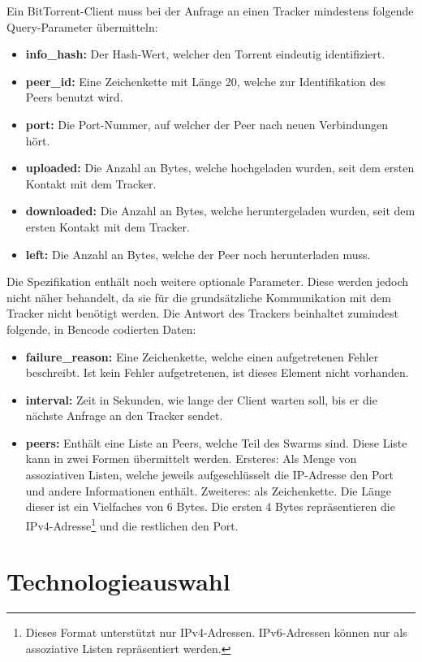 Ein BitTorrent-Client muss bei der Anfrage an einen Tracker mindestens folgende Query-Parameter übermitteln:
\begin{itemize}
    \item \textbf{info\_hash:} Der Hash-Wert, welcher den Torrent eindeutig identifiziert.
    \item \textbf{peer\_id:} Eine Zeichenkette mit Länge 20, welche zur Identifikation des Peers benutzt wird. 
    \item \textbf{port:} Die Port-Nummer, auf welcher der Peer nach neuen Verbindungen hört. 
    \item \textbf{uploaded:} Die Anzahl an Bytes, welche hochgeladen wurden, seit dem ersten Kontakt mit dem Tracker.
    \item \textbf{downloaded:} Die Anzahl an Bytes, welche heruntergeladen wurden, seit dem ersten Kontakt mit dem Tracker.
    \item \textbf{left:} Die Anzahl an Bytes, welche der Peer noch herunterladen muss.
\end{itemize}
Die Spezifikation enthält noch weitere optionale Parameter. Diese werden jedoch nicht näher behandelt, da sie für die grundsätzliche Kommunikation mit dem Tracker nicht benötigt werden.
Die Antwort des Trackers beinhaltet zumindest folgende, in Bencode codierten Daten:
\begin{itemize}
    \item \textbf{failure\_reason:} Eine Zeichenkette, welche einen aufgetretenen Fehler beschreibt. Ist kein Fehler aufgetretenen, ist dieses Element nicht vorhanden.
    \item \textbf{interval:} Zeit in Sekunden, wie lange der Client warten soll, bis er die nächste Anfrage an den Tracker sendet.
    \item \textbf{peers:} Enthält eine Liste an Peers, welche Teil des Swarms sind. Diese Liste kann in zwei Formen übermittelt werden. Ersteres:  Als Menge von assoziativen Listen, welche jeweils aufgeschlüsselt die IP-Adresse den Port und andere Informationen enthält. Zweiteres: als Zeichenkette. Die Länge dieser ist ein Vielfaches von 6 Bytes. Die ersten 4 Bytes repräsentieren die IPv4-Adresse\footnote[1]{Dieses Format unterstützt nur IPv4-Adressen. IPv6-Adressen können nur als assoziative Listen repräsentiert werden.} und die restlichen den Port.
\end{itemize}

\section{Technologieauswahl}


